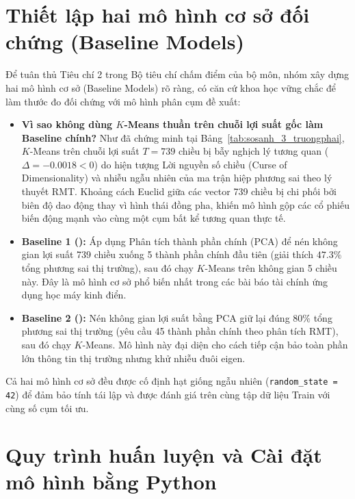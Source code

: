 \documentclass[12pt,a4paper,oneside,openany]{report}
\begin{document}
\section{Thiết lập hai mô hình cơ sở đối chứng (Baseline Models)}
\label{sec:baseline_models}

Để tuân thủ Tiêu chí 2 trong Bộ tiêu chí chấm điểm của bộ môn, nhóm xây dựng hai mô hình cơ sở (Baseline Models) rõ ràng, có căn cứ khoa học vững chắc để làm thước đo đối chứng với mô hình phân cụm đề xuất:
\begin{itemize}
  \item \textbf{Vì sao không dùng $K$-Means thuần trên chuỗi lợi suất gốc làm Baseline chính?} Như đã chứng minh tại Bảng~\ref{tab:sosanh_3_truongphai}, $K$-Means trên chuỗi lợi suất $T = 739$ chiều bị bẫy nghịch lý tương quan ($\Delta = -0.0018 < 0$) do hiện tượng Lời nguyền số chiều (Curse of Dimensionality) và nhiễu ngẫu nhiên của ma trận hiệp phương sai theo lý thuyết RMT. Khoảng cách Euclid giữa các vector 739 chiều bị chi phối bởi biên độ dao động thay vì hình thái đồng pha, khiến mô hình gộp các cổ phiếu biến động mạnh vào cùng một cụm bất kể tương quan thực tế.
  \item \textbf{Baseline 1 ():} Áp dụng Phân tích thành phần chính (PCA) để nén không gian lợi suất 739 chiều xuống 5 thành phần chính đầu tiên (giải thích $47.3\%$ tổng phương sai thị trường), sau đó chạy $K$-Means trên không gian 5 chiều này. Đây là mô hình cơ sở phổ biến nhất trong các bài báo tài chính ứng dụng học máy kinh điển.
  \item \textbf{Baseline 2 ():} Nén không gian lợi suất bằng PCA giữ lại đúng $80\%$ tổng phương sai thị trường (yêu cầu 45 thành phần chính theo phân tích RMT), sau đó chạy $K$-Means. Mô hình này đại diện cho cách tiếp cận bảo toàn phần lớn thông tin thị trường nhưng khử nhiễu đuôi eigen.
\end{itemize}

Cả hai mô hình cơ sở đều được cố định hạt giống ngẫu nhiên (\texttt{random\_state = 42}) để đảm bảo tính tái lập và được đánh giá trên cùng tập dữ liệu Train với cùng số cụm tối ưu.

\section{Quy trình huấn luyện và Cài đặt mô hình bằng Python}
\label{sec:quytrinh_caidat}
\end{document}
